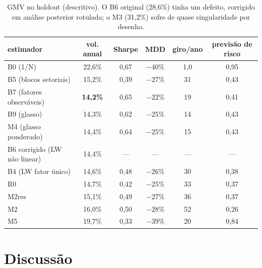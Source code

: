 \documentclass[11pt,a4paper]{article}
\begin{document}
\begin{table}[h]
\centering\small
\begin{tabular}{lccccc}
\toprule
estimador & vol. anual & Sharpe & MDD & giro/ano & previsão de risco \\
\midrule
B0 (1/N) & 22,6\% & 0,67 & $-40\%$ & 1,0 & 0,95 \\
B5 (blocos setoriais) & 15,2\% & 0,39 & $-27\%$ & 31 & 0,43 \\
B7 (fatores observáveis) & \textbf{14,2\%} & 0,65 & $-22\%$ & 19 & 0,41 \\
B9 (glasso) & 14,3\% & 0,62 & $-25\%$ & 14 & 0,43 \\
M4 (glasso ponderado) & 14,4\% & 0,64 & $-25\%$ & 15 & 0,43 \\
B6 corrigido (LW não linear) & 14,4\% & --- & --- & --- & --- \\
B4 (LW fator único) & 14,6\% & 0,48 & $-26\%$ & 30 & 0,38 \\
R0 & 14,7\% & 0,42 & $-25\%$ & 33 & 0,37 \\
M2res & 15,1\% & 0,49 & $-27\%$ & 36 & 0,37 \\
M2 & 16,0\% & 0,50 & $-28\%$ & 52 & 0,26 \\
M5 & 19,7\% & 0,33 & $-39\%$ & 20 & 0,84 \\
\bottomrule
\end{tabular}
\caption{GMV no holdout (descritivo). O B6 original (28,6\%) tinha um defeito, corrigido em análise posterior rotulada; o M3 (31,2\%) sofre de quase singularidade por desenho.}
\end{table}

\section{Discussão}\label{sec:discussao}
\end{document}
